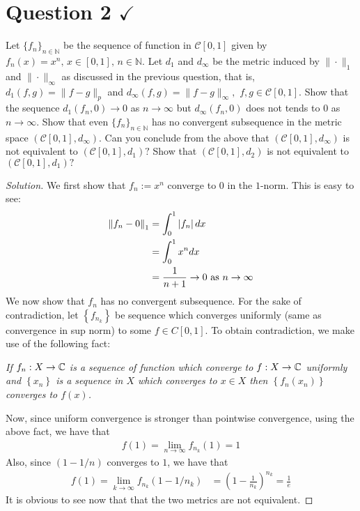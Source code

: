 \section{Question 2 \texorpdfstring{$\checkmark$}{}}
\horz
Let $\{f_n\}_{n\in\mathbb N}$ be the sequence of function in $\mathscr C[0,1]$ given  by $f_n(x)=x^n,\,x\in[0,1],\,n\in\mathbb N.$ Let $d_1$ and $d_{\infty}$ be the metric induced by $\|\cdot\|_1$ and $\|\cdot\|_{\infty}$ as discussed in the previous question, that is, $d_1(f,g)=\|f-g\|_p$ and $d_{\infty}(f,g)=\|f-g\|_{\infty},\,\,f,g\in\mathscr C[0,1].$ Show that the sequence $d_1(f_n,0) \to 0$ as $n\to \infty$ but  $d_{\infty}(f_n,0)$ does not tends to $0$ as $n\to \infty.$ Show that even $\{f_n\}_{n\in\mathbb N}$ has no convergent subsequence in the metric space $(\mathscr C[0,1], d_{\infty}).$ Can you conclude from the above that $(\mathscr C[0,1], d_{\infty})$ is not equivalent to $(\mathscr C[0,1], d_{1})?$ Show that $(\mathscr C[0,1], d_{2})$ is not equivalent to $(\mathscr C[0,1], d_{1})?$
\horz

\begin{proof}[Solution]
    We first show that $f_{n} := x^{n}$ converge to $0$ in the $1$-norm. This is easy to see:
    \begin{align*}
	\left\lVert f_{n}-0 \right\rVert_{1} &= \int_{0}^{1} \left\lvert f_{n} \right\rvert dx \\
	&= \int_{0}^{1} x^{n} dx \\
	&= \frac{1}{n+1} \to 0 \text{ as } n\to \infty 
    \end{align*}
    We now show that $f_{n}$ has no convergent subsequence. For the sake of contradiction, let $\left\{ f_{n_{k}} \right\}$ be sequence which converges uniformly (same as convergence in sup norm) to some $f\in C[0,1]$. To obtain contradiction, we make use of the following fact:
    \begin{center}
	\textit{If $f_{n}: X \to \mathbb C$ is a sequence of function which converge to $f: X \to \mathbb C$ uniformly and $\left\{ x_{n} \right\}$ is a sequence in $X$ which converges to $x\in X$ then $\left\{ f_{n} \left( x_{n} \right) \right\}$ converges to $f\left( x \right)$.}
    \end{center}

    Now, since uniform convergence is stronger than pointwise convergence, using the above fact, we have that
	\begin{align*}
	    f(1) = \lim_{n\to \infty} f_{n_{k}} \left( 1 \right) = 1
	\end{align*}
	Also, since $\left( 1-1/n \right)$ converges to $1$, we have that
	\begin{align*}
	f(1)= \lim_{k\to \infty} f_{n_{k}} \left( 1-1/n_{k} \right) &=  \left( 1- \frac{1}{n_k} \right)^{n_{k}}= \frac{1}{e}
	\end{align*}
	 It is obvious to see now that that the two metrics are not equivalent.
\end{proof}
